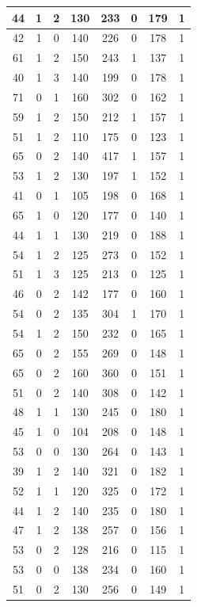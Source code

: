 \documentclass{article}
\begin{document}
\begin{longtable}{|c|c|c|c|c|c|c|c|}
\hline
44 & 1 & 2 & 130 & 233 & 0 & 179 & 1 \\
\hline
42 & 1 & 0 & 140 & 226 & 0 & 178 & 1 \\
\hline
61 & 1 & 2 & 150 & 243 & 1 & 137 & 1 \\
\hline
40 & 1 & 3 & 140 & 199 & 0 & 178 & 1 \\
\hline
71 & 0 & 1 & 160 & 302 & 0 & 162 & 1 \\
\hline
59 & 1 & 2 & 150 & 212 & 1 & 157 & 1 \\
\hline
51 & 1 & 2 & 110 & 175 & 0 & 123 & 1 \\
\hline
65 & 0 & 2 & 140 & 417 & 1 & 157 & 1 \\
\hline
53 & 1 & 2 & 130 & 197 & 1 & 152 & 1 \\
\hline
41 & 0 & 1 & 105 & 198 & 0 & 168 & 1 \\
\hline
65 & 1 & 0 & 120 & 177 & 0 & 140 & 1 \\
\hline
44 & 1 & 1 & 130 & 219 & 0 & 188 & 1 \\
\hline
54 & 1 & 2 & 125 & 273 & 0 & 152 & 1 \\
\hline
51 & 1 & 3 & 125 & 213 & 0 & 125 & 1 \\
\hline
46 & 0 & 2 & 142 & 177 & 0 & 160 & 1 \\
\hline
54 & 0 & 2 & 135 & 304 & 1 & 170 & 1 \\
\hline
54 & 1 & 2 & 150 & 232 & 0 & 165 & 1 \\
\hline
65 & 0 & 2 & 155 & 269 & 0 & 148 & 1 \\
\hline
65 & 0 & 2 & 160 & 360 & 0 & 151 & 1 \\
\hline
51 & 0 & 2 & 140 & 308 & 0 & 142 & 1 \\
\hline
48 & 1 & 1 & 130 & 245 & 0 & 180 & 1 \\
\hline
45 & 1 & 0 & 104 & 208 & 0 & 148 & 1 \\
\hline
53 & 0 & 0 & 130 & 264 & 0 & 143 & 1 \\
\hline
39 & 1 & 2 & 140 & 321 & 0 & 182 & 1 \\
\hline
52 & 1 & 1 & 120 & 325 & 0 & 172 & 1 \\
\hline
44 & 1 & 2 & 140 & 235 & 0 & 180 & 1 \\
\hline
47 & 1 & 2 & 138 & 257 & 0 & 156 & 1 \\
\hline
53 & 0 & 2 & 128 & 216 & 0 & 115 & 1 \\
\hline
53 & 0 & 0 & 138 & 234 & 0 & 160 & 1 \\
\hline
51 & 0 & 2 & 130 & 256 & 0 & 149 & 1 \\

\end{longtable}
\end{document}
